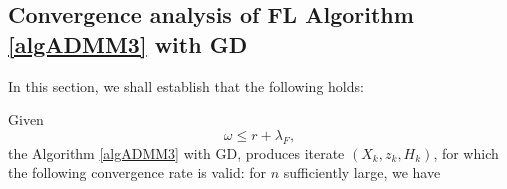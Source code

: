\subsection{Convergence analysis of FL Algorithm \ref{algADMM3} with GD} 
In this section, we shall establish that the following holds: 
\begin{theorem}\label{main:theorem11} 
Given 
\begin{equation}
\omega \leq r + \lambda_F, 
\end{equation}
the Algorithm \ref{algADMM3} with GD, produces iterate $(X_k, z_k, H_k)$, for which the following convergence rate is valid: for $n$ sufficiently large, we have 
\end{theorem}
